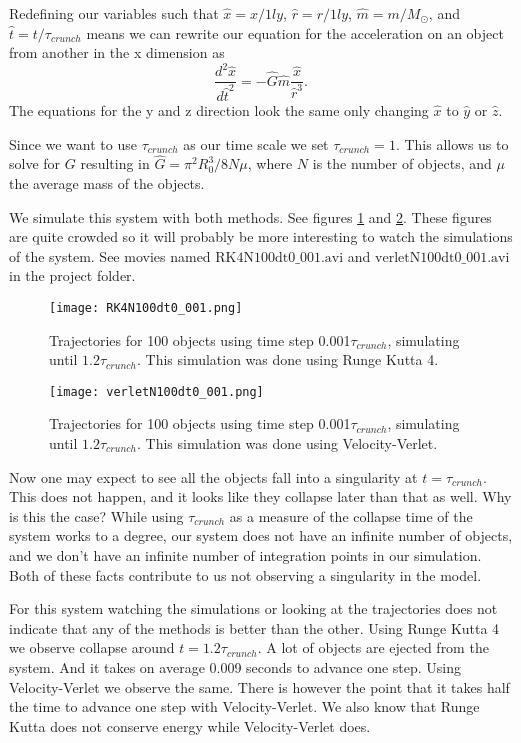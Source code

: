 \documentclass{aa}   %
\begin{document}
Redefining our variables such that $\hat x = x/1ly$, $\hat r= r/1ly$, $\hat m = m/M_\odot$, and $\hat t = t/\tau_{crunch}$ means we can rewrite our equation for the acceleration on an object from another in the x dimension as 
\begin{equation}
\frac{d^2 \hat x}{d\hat t^2} = -\hat G \hat m \frac{\hat x}{\hat r^3}.
\end{equation}
The equations for the y and z direction look the same only changing $\hat x$ to $\hat y$ or $\hat z$.

Since we want to use $\tau_{crunch}$ as our time scale we set $\tau_{crunch} = 1$. This allows us to solve for $G$ resulting in 
$\hat G = \pi^2 R_0^3/8N\mu$, where $N$ is the number of objects, and $\mu$ the average mass of the objects. 

We simulate this system with both methods. See figures \ref{RK4N100dt0_001} and \ref{verletN100dt0_001}. These figures are quite crowded so it will probably be more interesting to watch the simulations of the system. See movies named 
$\mathrm{RK4N100dt0\_001.avi}$ and $\mathrm{verletN100dt0\_001.avi}$ in the project folder.
\begin{figure}[hbtp]
 \centering
 \texttt{[image: RK4N100dt0\_001.png]}
 \caption[]{\label{RK4N100dt0_001}
   Trajectories for 100 objects using time step 0.001$\tau_{crunch}$, simulating until $1.2\tau_{crunch}$. This simulation was done using Runge Kutta 4.
 }
\end{figure}
\begin{figure}[hbtp]
 \centering
 \texttt{[image: verletN100dt0\_001.png]}
 \caption[]{\label{verletN100dt0_001}
   Trajectories for 100 objects using time step 0.001$\tau_{crunch}$, simulating until $1.2\tau_{crunch}$. This simulation was done using Velocity-Verlet.
 }
\end{figure}

Now one may expect to see all the objects fall into a singularity at $t = \tau_{crunch}$. This does not happen, and it looks like they collapse later than that as well. Why is this the case? While using $\tau_{crunch}$ as a measure of the collapse time of the system works to a degree, our system does not have an infinite number of objects, and we don't have an infinite number of integration points in our simulation. Both of these facts contribute to us not observing a singularity in the model.

For this system watching the simulations or looking at the trajectories does not indicate that any of the methods is better than the other. 
Using Runge Kutta 4 we observe collapse around $t=1.2\tau_{crunch}$.
A lot of objects are ejected from the system. And it takes on average 0.009 seconds to advance one step.
Using Velocity-Verlet we observe the same.
There is however the point that it takes half the time to advance one step with Velocity-Verlet. 
We also know that Runge Kutta does not conserve energy while Velocity-Verlet does.
\end{document}

